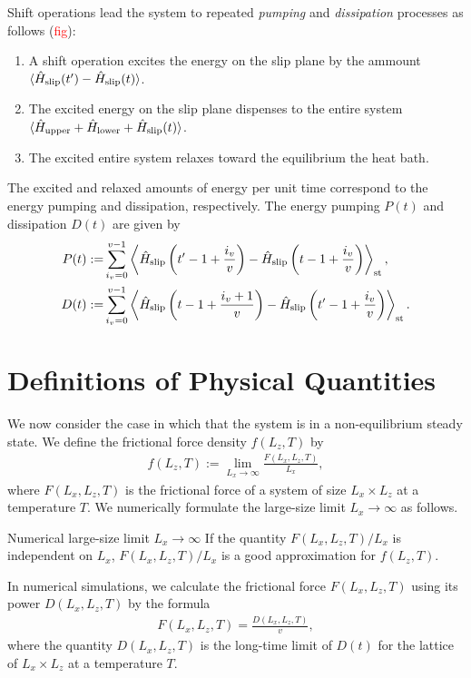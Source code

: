 Shift operations lead the system to repeated \textit{pumping} and \textit{dissipation} processes as follows (\textcolor{red}{fig}):
\begin{enumerate}
	\item A shift operation excites the energy on the slip plane by the ammount $\langle\hat{H}_{\rm slip}(t')-\hat{H}_{\rm slip}(t)\rangle$.
	\item The excited energy on the slip plane dispenses to the entire system $\langle\hat{H}_{\rm upper} + \hat{H}_{\rm lower} + \hat{H}_{\rm slip}(t)\rangle$.
	\item The excited entire system relaxes toward the equilibrium the heat bath.
\end{enumerate}
The excited and relaxed amounts of energy per unit time correspond to the energy pumping and dissipation, respectively. The energy pumping $P(t)$ and dissipation $D(t)$ are given by
\begin{align}
P(t):=&\sum_{i_{v}=0}^{v-1}\left\langle \hat{H}_{\rm slip}\left(t'-1+\frac{i_{v}}{v}\right) - \hat{H}_{\rm slip}\left(t-1+\frac{i_{v}}{v}\right)\right\rangle_{\rm st},\\
D(t):=&\sum_{i_{v}=0}^{v-1}\left\langle \hat{H}_{\rm slip}\left(t-1+\frac{i_{v}+1}{v}\right) - \hat{H}_{\rm slip}\left(t'-1+\frac{i_{v}}{v}\right)\right\rangle_{\rm st}.
\end{align}

\section{Definitions of Physical Quantities}

We now consider the case in which that the system is in a non-equilibrium steady state. We define the frictional force density $f(L_{z}, T)$ by
\begin{align}
f(L_{z}, T):=\lim_{L_{x}\to\infty}\frac{F(L_{x}, L_{z}, T)}{L_{x}},
\end{align}
where $F(L_{x}, L_{z}, T)$ is the frictional force of a system of size $L_{x}\times L_{z}$ at a temperature $T$. We numerically formulate the  large-size limit $L_{x}\to\infty$ as follows.
\begin{itembox}{Numerical large-size limit $L_{x}\to\infty$}
	If the quantity $F(L_{x}, L_{z}, T)/L_{x}$ is independent on $L_{x}$, $F(L_{x}, L_{z}, T)/L_{x}$ is a good approximation for $f(L_{z}, T)$.
\end{itembox}
In numerical simulations, we calculate the frictional force $F(L_{x}, L_{z}, T)$ using its power $D(L_{x}, L_{z}, T)$ by the formula
\begin{align}
F(L_{x}, L_{z}, T)=\frac{D(L_{x}, L_{z}, T)}{v}\label{for:frictionalforce},
\end{align}
where the quantity $D(L_{x}, L_{z}, T)$ is the long-time limit of $D(t)$ for the lattice of $L_{x}\times L_{z}$ at a temperature $T$.

